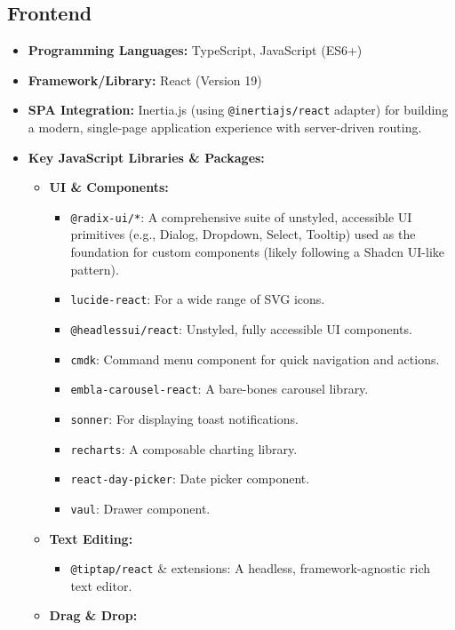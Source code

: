 \documentclass[12pt,a4paper]{article}
\begin{document}
\subsection{Frontend}
\begin{itemize}
    \item \textbf{Programming Languages:} TypeScript, JavaScript (ES6+)
    \item \textbf{Framework/Library:} React (Version 19)
    \item \textbf{SPA Integration:} Inertia.js (using \texttt{@inertiajs/react} adapter) for building a modern, single-page application experience with server-driven routing.
    \item \textbf{Key JavaScript Libraries \& Packages:}
    \begin{itemize}
        \item \textbf{UI \& Components:}
        \begin{itemize}
            \item \texttt{@radix-ui/*}: A comprehensive suite of unstyled, accessible UI primitives (e.g., Dialog, Dropdown, Select, Tooltip) used as the foundation for custom components (likely following a Shadcn UI-like pattern).
            \item \texttt{lucide-react}: For a wide range of SVG icons.
            \item \texttt{@headlessui/react}: Unstyled, fully accessible UI components.
            \item \texttt{cmdk}: Command menu component for quick navigation and actions.
            \item \texttt{embla-carousel-react}: A bare-bones carousel library.
            \item \texttt{sonner}: For displaying toast notifications.
            \item \texttt{recharts}: A composable charting library.
            \item \texttt{react-day-picker}: Date picker component.
            \item \texttt{vaul}: Drawer component.
        \end{itemize}
        \item \textbf{Text Editing:}
        \begin{itemize}
            \item \texttt{@tiptap/react} \& extensions: A headless, framework-agnostic rich text editor.
        \end{itemize}
        \item \textbf{Drag \& Drop:}

\end{itemize}
\end{itemize}
\end{document}
